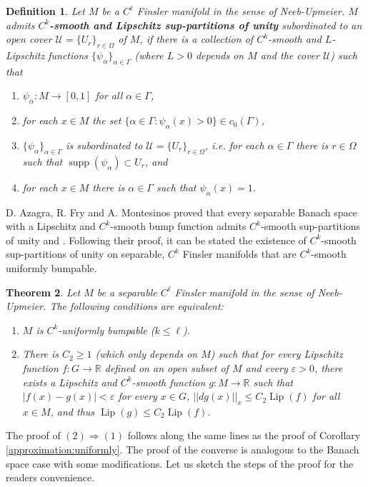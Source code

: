 \documentclass[11pt]{amsart}
\newtheorem{thm}{Theorem}[section]
\newtheorem{defn}[thm]{Definition}
\numberwithin{equation}{section}
\begin{document}
\begin{defn}
Let $M$ be a  $C^\ell$ Finsler manifold in the sense of Neeb-Upmeier. $M$ admits \textbf{$C^k$-smooth and Lipschitz sup-partitions of unity}  subordinated to an open cover  $\mathcal{U}=\{U_r\}_{r\in \Omega}$ of $M$, if there is a collection of $C^k$-smooth and $L$-Lipschitz functions $\{\psi_\alpha\}_{\alpha\in\Gamma}$ (where $L>0$ depends on $M$ and the cover $\mathcal{U}$)
such that
\begin{enumerate}
\item[(S1)] $\psi_\alpha:M\to[0,1]$ for all $\alpha\in \Gamma$,
\item[(S2)] for each $x\in M$ the set $\{\alpha\in\Gamma : \psi_\alpha(x)>0\}\in c_0(\Gamma)$,
\item[(S3)] $\{\psi_\alpha\}_{\alpha\in \Gamma}$ is subordinated to $\mathcal{U}=\{U_r\}_{r\in \Omega}$, i.e. for
 each $\alpha\in \Gamma$ there is $r\in \Omega$ such that ${\operatorname{supp}} (\psi_\alpha)\subset  U_{r}$, and
\item[(S4)] for each $x\in M$ there is $\alpha\in\Gamma$ such that $\psi_\alpha(x)=1$.
\end{enumerate}
\end{defn}

D. Azagra, R. Fry and A. Montesinos proved that  every separable Banach space with a Lipschitz and $C^k$-smooth bump function admits $C^k$-smooth sup-partitions of unity \cite{Fry1} and \cite{azafrymon}. Following their proof, it can be stated
 the existence of $C^k$-smooth sup-partitions of unity on separable, $C^k$ Finsler manifolds that are $C^k$-smooth uniformly bumpable.

\begin{thm}\label{equiv}
Let $M$ be a separable $C^\ell$ Finsler manifold  in the sense of Neeb-Upmeier. The following conditions are equivalent:
\begin{enumerate}
\item[(1)] $M$ is $C^k$-uniformly bumpable ($k\le \ell$).
\item[(2)] There is $C_2\ge 1$ (which only depends on $M$) such that for every  Lipschitz function $f:G\to{\mathbb{R}}$ defined on an open subset of $M$ and every $\varepsilon>0$, there exists a Lipschitz and $C^k$-smooth function $g:M\to{\mathbb{R}}$ such that $|f(x)-g(x)|<\varepsilon$ for every $x\in G$, $||dg(x)||_x \le C_2{\operatorname{Lip}}(f)$  for all $x\in M$, and thus ${\operatorname{Lip}}(g)\le C_2{\operatorname{Lip}}(f)$.
\end{enumerate}
\end{thm}
The proof of  $(2)\Rightarrow (1)$ follows along the same lines as the proof of Corollary \ref{approximation:uniformly}.
The proof of the converse  is analogous to the   Banach space case   \cite{Fry1, azafrymon, HajekJohanis}
with some modifications. Let us sketch the steps of the proof for the readers convenience.
\end{document}
